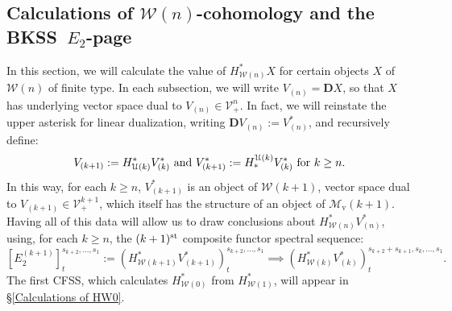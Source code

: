 \documentclass[11pt]{amsart} \renewcommand{\baselinestretch}{1.2}
\theoremstyle{plain}
\numberwithin{equation}{section} %
\theoremstyle{plain}
\numberwithin{equation}{chapter} %
\newcommand{\calU}{\mathcal{U}}
\newcommand{\calV}{\mathcal{V}}
\newcommand{\calw}{\mathcal{W}}
\newcommand{\calMv}{\mathcal{M}\dver}
\newcommand{\vect}[2]{\calV^{#1}_{#2}}
\newcommand{\E}[5]{[E^{#1}_{#2}#3]^{#4}_{#5}}
\newcommand{\dver}{_\mathrm{v}}
\newcommand{\dual}{\mathbf{D}}
\newcommand{\BKSS}{BKSS}
\newcommand{\CFSS}{CFSS}
\newcommand{\SectionOrChapter}[1]{\section{\textbf{#1}}}
\begin{document}
\begin{Calculations of HWn}
\SectionOrChapter{Calculations of ${\calw(n)}$-cohomology and the \BKSS\ $E_2$-page}
\label{Calculations of HWn}
In this section, we will calculate the value of $H^*_{\calw(n)}X$ for certain  objects $X$ of $\calw(n)$ of finite type. In each subsection, we will write $V_{(n)}=\dual X$, so that $X$ has underlying vector space dual to $V_{{(n)}}\in\vect{n}{+}$. In fact, we will reinstate the upper asterisk for linear dualization, writing $\dual V_{(n)}:=V^*_{(n)}$, and recursively define:
\[V_{(k+1)}:=H^*_{\calU(k)}V^*_{(k)}\textup{ and }V^*_{(k+1)}:=H_*^{\calU(k)}V^*_{(k)}\textup{ for $k\geq n$}.\]
In this way, for each $k\geq n$, $V^*_{(k+1)}$ is an object of $\calw(k+1)$, vector space dual to $V_{(k+1)}\in\vect{k+1}{+}$, which itself has the structure of an object of $\calMv(k+1)$.
Having all of this data will allow us to draw conclusions about $H^*_{\calw(n)}V^*_{(n)}$, using, for each $k\geq n$, the $(k+1)^{\textup{st}}$ composite functor spectral sequence:
\[\E{(k+1)}{2}{}{s_{k+2},\ldots,s_1}{t}:=(H^*_{\calw(k+1)}V^*_{(k+1)})^{s_{k+2},\ldots,s_1}_{t}\implies (H^*_{\calw(k)}V^*_{(k)})^{s_{k+2}+s_{k+1},s_k,\ldots,s_1}_{t}.\]
The first \CFSS, which calculates $H^*_{\calw(0)}$ from $H^*_{\calw(1)}$, will appear in \S\ref{Calculations of HW0}.




\end{Calculations of HWn}
\end{document}
